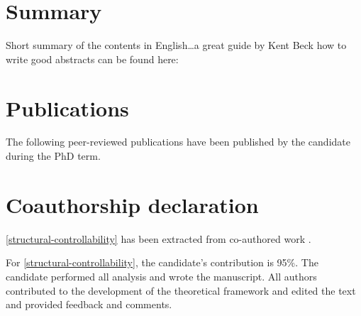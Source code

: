 \setcounter{secnumdepth}{-1}
\begingroup
\let\clearpage\relax
\let\cleardoublepage\relax
\let\cleardoublepage\relax
\chapter{Summary}
Short summary of the contents in English\dots a great guide by
Kent Beck how to write good abstracts can be found here:


\vfill

\endgroup
\setcounter{secnumdepth}{3}

\vfill

%
\setcounter{secnumdepth}{-1}
\chapter{Publications}%
\setcounter{secnumdepth}{3}
%
\noindent The following peer-reviewed publications have been published by the candidate during the PhD term.
%
\begin{refsection}
    \nocite{*} %
    \printbibliography[heading=none,keyword=own]
\end{refsection}
%

\setcounter{secnumdepth}{-1}
\chapter{Coauthorship declaration}
\thispagestyle{empty}
\setcounter{secnumdepth}{3}
\begin{refsection}
\autoref{structural-controllability} has been extracted from co-authored work \autocites{cagua_keystoneness_2019}.

\printbibliography[heading=none]

For \autoref{structural-controllability}, the candidate's contribution is 95\%. The candidate performed all analysis and wrote the manuscript. All authors contributed to the development of the theoretical framework and edited the text and provided feedback and comments.

\end{refsection}

